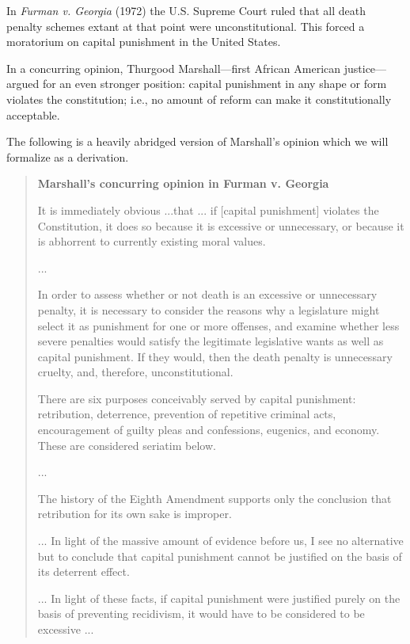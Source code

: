 
\newcommand{\lbhelper}[1]{}
 

In \emph{Furman v. Georgia} (1972) the U.S. Supreme Court ruled that all death 
penalty schemes extant at that point were unconstitutional. This forced a 
moratorium on capital punishment in the United States.

In a concurring opinion, Thurgood Marshall---first African American 
justice---argued for an even stronger position: capital punishment in any shape 
or form violates the constitution; i.e., no amount of reform can make it 
constitutionally acceptable. 

The following is a heavily abridged version of Marshall's opinion which we will 
formalize as a derivation.

\begin{quote}
 \textbf{Marshall's concurring opinion in Furman v. Georgia}


It is immediately obvious ...that ... if [capital punishment]  violates the 
Constitution, it does so because it is excessive or unnecessary, or because it 
is abhorrent to currently existing moral values.

...
 
 In order to assess whether or not death is an excessive or unnecessary penalty, 
 it is necessary to consider the reasons why a legislature might select it as 
 punishment for one or more offenses, and examine whether less severe penalties 
 would satisfy the legitimate legislative wants as well as capital punishment.  
 If they would, then the death penalty is unnecessary cruelty, and, therefore, 
 unconstitutional.

 There are six purposes conceivably served by capital punishment: retribution, 
 deterrence, prevention of repetitive criminal acts, encouragement of guilty 
 pleas and confessions, eugenics, and economy. These are considered seriatim 
 below.

... 

 The history of the Eighth Amendment supports only the conclusion that 
 retribution for its own sake is improper.

...
 In light of the massive amount of evidence before us, I see no alternative but 
 to conclude that capital punishment cannot be justified on the basis of its 
 deterrent effect.

 ... In light of these facts, if capital punishment were justified purely on the 
 basis of preventing recidivism, it would have to be considered to be excessive 
 ...


\end{quote}
